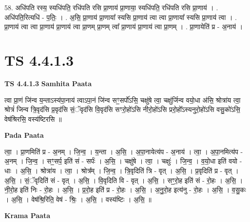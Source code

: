\documentclass[17pt]{extarticle}
\begin{document}
58. अधि॑पति रस्य॒ स्यधि॑पति॒ रधि॑पति रसि प्रा॒णाय॑ प्रा॒णाया॒ स्यधि॑पति॒ रधि॑पति रसि प्रा॒णाय॑ । . अधि॑पति॒रित्यधि॑ - प॒तिः॒ । . अ॒सि॒ प्रा॒णाय॑ प्रा॒णाया᳚ स्यसि प्रा॒णाय॑ त्वा त्वा प्रा॒णाया᳚ स्यसि प्रा॒णाय॑ त्वा । . प्रा॒णाय॑ त्वा त्वा प्रा॒णाय॑ प्रा॒णाय॑ त्वा प्रा॒णम् प्रा॒णम् त्वा᳚ प्रा॒णाय॑ प्रा॒णाय॑ त्वा प्रा॒णम् । . प्रा॒णायेति॑ प्र - अ॒नाय॑ । \newline
\pagebreak
{}

\section{ TS 4.4.1.3 }

\textbf{TS 4.4.1.3 } \newline
\textbf{Samhita Paata} \newline

त्वा प्रा॒णं जि॑न्व य॒न्ताऽस्य॑पा॒नाय॑ त्वाऽपा॒नं जि॑न्व सꣳ॒॒सर्पो॑ऽसि॒ चक्षु॑षे त्वा॒ चक्षु॑र्जिन्व वयो॒धा अ॑सि॒ श्रोत्रा॑य त्वा॒ श्रोत्रं॑ जिन्व त्रि॒वृद॑सि प्र॒वृद॑सि सं॒ॅवृद॑सि वि॒वृद॑सि सꣳरो॒हो॑ऽसि नीरो॒हो॑ऽसि प्ररो॒हो᳚ऽस्यनुरो॒हो॑ऽसि वसु॒को॑ऽसि॒ वेष॑श्रिरसि॒ वस्य॑ष्टिरसि ॥ \newline

\textbf{Pada Paata} \newline

त्वा॒ । प्रा॒णमिति॑ प्र - अ॒नम् । जि॒न्व॒ । य॒न्ता । अ॒सि॒ । अ॒पा॒नायेत्य॑प - अ॒नाय॑ । त्वा॒ । अ॒पा॒नमित्य॑प - अ॒नम् । जि॒न्व॒ । सꣳ॒॒सर्प॒ इति॑ सं - सर्पः॑ । अ॒सि॒ । चक्षु॑षे । त्वा॒ । चक्षुः॑ । जि॒न्व॒ । व॒यो॒धा इति॑ वयो - धाः । अ॒सि॒ । श्रोत्रा॑य । त्वा॒ । श्रोत्र᳚म् । जि॒न्व॒ । त्रि॒वृदिति॑ त्रि - वृत् । अ॒सि॒ । प्र॒वृदिति॑ प्र - वृत् । अ॒सि॒ । सं॒ॅवृदिति॑ सं - वृत् । अ॒सि॒ । वि॒वृदिति वि - वृत् । अ॒सि॒ । सꣳ॒॒रो॒ह इति॑ सं - रो॒हः । अ॒सि॒ । नी॒रो॒ह इति॑ निः - रो॒हः । अ॒सि॒ । प्र॒रो॒ह इति॑ प्र - रो॒हः । अ॒सि॒ । अ॒नु॒रो॒ह इत्य॑नु - रो॒हः । अ॒सि॒ । व॒सु॒कः । अ॒सि॒ । वेष॑श्रि॒रिति॒ वेष॑ - श्रिः॒ । अ॒सि॒ । वस्य॑ष्टिः । अ॒सि॒ ॥  \newline


\textbf{Krama Paata} \newline
\end{document}
